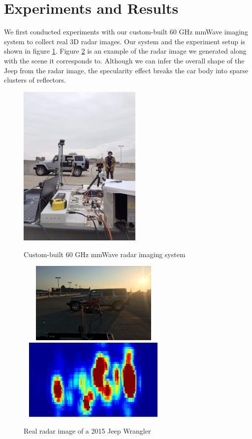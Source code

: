 \section{ Experiments and Results} \label{experiment}
We first conducted experiments with our custom-built 60 GHz mmWave imaging system to collect real 3D radar images. Our system and the experiment setup is shown in figure \ref{fig_exp}. Figure \ref{fig_real} is an example of the radar image we generated along with the scene it corresponds to. Although we can infer the overall shape of the Jeep from the radar image, the specularity effect breaks the car body into sparse clusters of reflectors.

\begin{figure}
	\centering
	\includegraphics[width=6cm,height=8cm]{./figure/exp_2.png}\\
	\caption{Custom-built 60 GHz mmWave radar imaging system}
	\label{fig_exp}
\end{figure}
 
\begin{figure}
	\centering
	\includegraphics[width=7.5cm,height=4cm]{./figure/exp_1.png}\\
	\vspace{0.2 cm}
	\includegraphics[width=7.5cm,height=4cm]{./figure/exp_1_img.jpg}
	\caption{Real radar image of a 2015 Jeep Wrangler}
	\label{fig_real}
\end{figure} 

